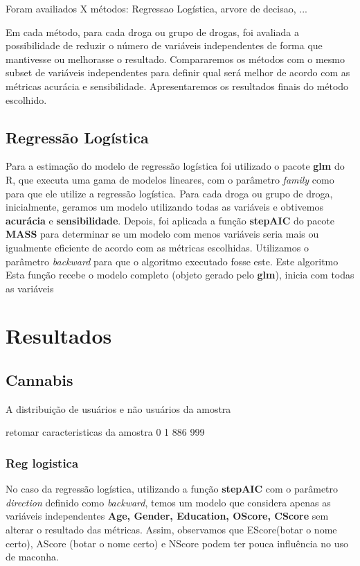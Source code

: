 \documentclass[
	article,			%
	11pt,				%
	oneside,			%
	a4paper,			%
	english,			%
	brazil,				%
	sumario=tradicional
	]{abntex2}
\begin{document}
Foram availiados X métodos: Regressao Logística, arvore de decisao, ... 

Em cada método, para cada droga ou grupo de drogas, foi avaliada a possibilidade de reduzir o número de variáveis independentes de forma que mantivesse ou melhorasse o resultado. Compararemos os métodos com o mesmo subset de variáveis independentes para definir qual será melhor de acordo com as métricas acurácia e sensibilidade. Apresentaremos os resultados finais do método escolhido. 

\subsection{Regressão Logística}

Para a estimação do modelo de regressão logística foi utilizado o pacote \textbf{glm} do R, que executa uma gama de modelos lineares, com o parâmetro \emph{family} como  para que ele utilize a regressão logística.
Para cada droga ou grupo de droga, inicialmente, geramos um modelo utilizando todas as variáveis e obtivemos \textbf{acurácia} e \textbf{sensibilidade}. Depois, foi aplicada a função \textbf{stepAIC} do pacote \textbf{MASS} para determinar se um modelo com menos variáveis seria mais ou igualmente eficiente de acordo com as métricas escolhidas. Utilizamos o parâmetro \emph{backward} para que o algoritmo executado fosse este. Este algoritmo Esta função recebe o modelo completo (objeto gerado pelo \textbf{glm}), inicia com todas as variáveis 



\section{Resultados}

\subsection{Cannabis}

A distribuição de usuários e não usuários da amostra 

retomar caracteristicas da amostra
 0   1 
886 999 



\subsubsection{Reg logistica}

No caso da regressão logística, utilizando a função \textbf{stepAIC} com o parâmetro \emph{direction} definido como \emph{backward}, temos um modelo que considera apenas as variáveis independentes \textbf{Age, Gender, Education, OScore, CScore} sem alterar o resultado das métricas. Assim, observamos que EScore(botar o nome certo), AScore (botar o nome certo) e NScore podem ter pouca influência no uso de maconha.
\end{document}
